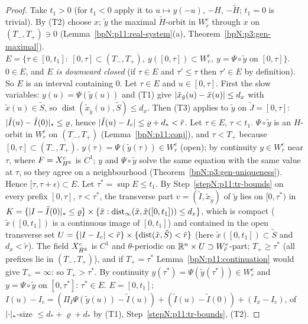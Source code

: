 \begin{proof}
Take $t_1>0$ (for $t_1<0$ apply it to $u\mapsto y(-u)$, $-H$, $-\tilde H$; $t_1=0$ is trivial).
\label{stepN:p11:tr-orbit} By (T2) choose $x$; $\tilde y$ the maximal $\tilde H$-orbit in $W^e_{\tilde r}$ through $x$ on $(T_-,T_+)\ni0$ (Lemma~\ref{bpN:p11:real-system}(a), Theorem~\ref{bpN:p3:gen-maximal}).
\label{stepN:p11:tr-E} $E=\{\tau\in[0,t_1]:\ [0,\tau]\subset(T_-,T_+),\ y([0,\tau])\subset W^e_r,\ y=\Psi\circ\tilde y\text{ on }[0,\tau]\}$. $0\in E$, and \emph{$E$ is downward closed} (if $\tau\in E$ and $\tau'\le\tau$ then $\tau'\in E$ by definition). So $E$ is an interval containing $0$.
\label{stepN:p11:tr-bounds} Let $\tau\in E$ and $u\in[0,\tau]$. First the slow variables: $y(u)=\Psi(\tilde y(u))$ and (T1) give $\lvert \tilde x_{\tilde y}(u)-\tilde x(u)\rvert\le d_x$ with $\tilde x(u)\in\tilde S$, so $\operatorname{dist}(\tilde x_{\tilde y}(u),\tilde S)\le d_x$. Then (T3) applies to $\tilde y$ on $\tilde J=[0,\tau]$: $\lvert \tilde I(u)-\tilde I(0)\rvert_*\le\varrho$, hence $\lvert \tilde I(u)-I_c\rvert\le\varrho+d_*<\tilde r$.
\label{stepN:p11:tr-open} Let $\tau\in E$, $\tau<t_1$. $\Psi\circ\tilde y$ is an $H$-orbit in $W^e_r$ on $(T_-,T_+)$ (Lemma~\ref{bpN:p11:conj}), and $\tau<T_+$ because $[0,\tau]\subset(T_-,T_+)$. $y(\tau)=\Psi(\tilde y(\tau))\in W^e_r$ (open); by continuity $y\in W^e_r$ near $\tau$, where $F=X^c_{H^{\mathbb{R}}}$ is $C^1$; $y$ and $\Psi\circ\tilde y$ solve the same equation with the same value at $\tau$, so they agree on a neighbourhood (Theorem~\ref{bpN:p3:gen-uniqueness}). Hence $[\tau,\tau+\epsilon)\subset E$.
\label{stepN:p11:tr-closed} Let $\tau^*=\sup E\le t_1$. By Step~\ref{stepN:p11:tr-bounds} on every prefix $[0,\tau]$, $\tau<\tau^*$, the transverse part $v=(\tilde I,\tilde x_{\tilde y})$ of $\tilde y$ lies on $[0,\tau^*)$ in $K=\{\lvert I-\tilde I(0)\rvert_*\le\varrho\}\times\{\tilde x:\operatorname{dist}_\infty(\tilde x,\tilde x([0,t_1]))\le d_x\}$, which is compact ($\tilde x([0,t_1])$ is a continuous image of $[0,t_1]$) and contained in the open transverse set $U=\{\lvert I-I_c\rvert<\tilde r\}\times\{\operatorname{dist}(\tilde x,\tilde S)<\tilde r\}$ (here $\tilde x([0,t_1])\subset\tilde S$ and $d_x<\tilde r$). The field $X^c_{\tilde H^{\mathbb{R}}}$ is $C^1$ and $\theta$-periodic on $\mathbb{R}^n\times U\supset W^e_{\tilde r}$-part; $T_+\ge\tau^*$ (all prefixes lie in $(T_-,T_+)$), and if $T_+=\tau^*$ Lemma~\ref{bpN:p11:continuation} would give $T_+=\infty$: so $T_+>\tau^*$. By continuity $y(\tau^*)=\Psi(\tilde y(\tau^*))\in W^e_r$ and $y=\Psi\circ\tilde y$ on $[0,\tau^*]$: $\tau^*\in E$.
\label{stepN:p11:tr-concl} $E=[0,t_1]$; $I(u)-I_c=(\Pi_I\Psi(\tilde y(u))-\tilde I(u))+(\tilde I(u)-\tilde I(0))+(I_x-I_c)$, of $\lvert \cdot\rvert_*$-size $\le d_*+\varrho+d_*$ by (T1), Step~\ref{stepN:p11:tr-bounds}, (T2).
\end{proof}

